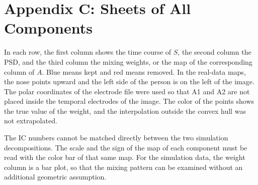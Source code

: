 \clearpage
\section*{Appendix C: Sheets of All Components}

In each row, the first column shows the time course of $S$, the second column the PSD, and the third column the mixing weights, or the map of the corresponding column of $A$. Blue means kept and red means removed. In the real-data maps, the nose points upward and the left side of the person is on the left of the image. The polar coordinates of the electrode file were used so that A1 and A2 are not placed inside the temporal electrodes of the image. The color of the points shows the true value of the weight, and the interpolation outside the convex hull was not extrapolated.

The IC numbers cannot be matched directly between the two simulation decompositions. The scale and the sign of the map of each component must be read with the color bar of that same map. For the simulation data, the weight column is a bar plot, so that the mixing pattern can be examined without an additional geometric assumption.


